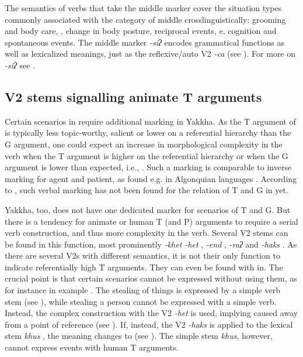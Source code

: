 The semantics of verbs that take the middle marker cover the situation types commonly associated with the category of middle crosslinguistically: grooming and body care, , change in body posture, reciprocal events, e, cognition and spontaneous events. The middle marker \emph{-siʔ} encodes grammatical functions as well as lexicalized meanings, just as the reflexive/auto V2 \emph{-ca} (see ). For more on  \emph{-siʔ} see .


\subsection{V2 stems signalling animate T arguments}\label{t-sap}

Certain scenarios in  require additional marking in Yakkha. As the T argument of  is typically less topic-worthy, salient or lower on a referential hierarchy than the G argument, one could expect an increase in morphological complexity in the verb when the T argument is higher on the referential hierarchy or when the G argument is lower than expected, i.e.,  \citep[128]{Comrie1989Language}. Such a marking is comparable to inverse marking for agent and patient, as found e.g. in Algonquian languages \citep{Zuniga2007_From}. According to \citet[90ff]{Haspelmath2007Ditransitive}, such verbal marking has not been found  for the relation of T and G in  yet. 

Yakkha, too, does not have one dedicated marker for  scenarios of T and G. But there is a tendency for animate or human T (and P) arguments to require a serial verb construction, and thus more complexity in the verb. Several V2 stems  can be found in this function, most prominently \emph{-khet \ti -het} , \emph{-end} , \emph{-raʔ}  and \emph{-haks} . As there are several V2s  with different semantics, it is not their only function to indicate referentially high T arguments. They can even be found with in. The crucial point is that certain scenarios cannot be expressed without using them, as for instance in example \Next. The stealing of things is expressed by a simple verb stem (see \Next[a]), while stealing a person cannot be expressed with a simple verb. Instead, the complex construction with the V2 \emph{-het}  is used, implying caused  away from a point of reference  (see \Next[b]). If, instead, the V2 \emph{-haks}  is applied to the lexical stem \emph{khus} , the meaning changes to  (see \Next[c]). The simple stem \emph{khus}, however, cannot express events with human T arguments.


